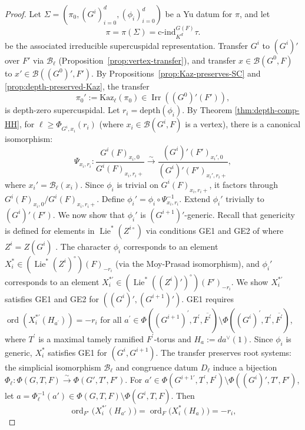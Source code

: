 \documentclass[american]{article}
\numberwithin{equation}{section}
\numberwithin{figure}{section}
\theoremstyle{plain}
\theoremstyle{definition}
\theoremstyle{remark}
\DeclareMathOperator{\Irr}{Irr}
\begin{document}
\begin{proof}
Let $\Sigma = (\pi_0, (G^i)_{i=0}^d, (\phi_i)_{i=0}^d)$ be a Yu datum for $\pi$, and let 
\[
\pi = \pi(\Sigma) = \mathrm{c\text{-}ind}_{K^d}^{G(F)} \tau.
\]
be the associated irreducible supercuspidal representation.
Transfer $G^i$ to $(G^i)'$ over $F'$ via $\mathscr{B}_\ell$ (Proposition~\ref{prop:vertex-transfer}), and transfer $x \in \mathcal{B}(G^0, F)$ to $x' \in \mathcal{B}((G^0)', F')$.
By Propositions~\ref{prop:Kaz-preserves-SC} and \ref{prop:depth-preserved-Kaz}, the transfer 
\[
\pi_0' := \mathrm{Kaz}_\ell(\pi_0) \in \Irr((G^0)'(F')),
\]
is depth-zero supercuspidal. Let \(r_i = \text{depth}(\phi_i)\). By Theorem \ref{thm:depth-comp-HH}, for \(\ell \geq \Phi_{G^i,x_i}(r_i)\) (where \(x_i \in \mathcal{B}(G^i, F)\) is a vertex), there is a canonical isomorphism:
     \[
     \Psi_{x_i, r_i}: \frac{G^i(F)_{x_i,0}}{G^i(F)_{x_i, r_i+}} \stackrel{\sim}{\longrightarrow} \frac{(G^i)'(F')_{x_i',0}}{(G^i)'(F')_{x_i', r_i+}},
     \]
where \(x_i' = \mathscr{B}_\ell(x_i)\). Since \(\phi_i\) is trivial on \(G^i(F)_{x_i, r_i+}\), it factors through \(G^i(F)_{x_i,0}/G^i(F)_{x_i, r_i+}\). Define \(\phi_i'=\phi_i\circ\Psi_{x_i, r_i}^{-1}\). Extend \(\phi_i'\) trivially to \((G^i)'(F')\). We now show that \(\phi_i'\) is \((G^{i+1})'\)-generic.  Recall that genericity is defined for elements in \(\operatorname{Lie}^*(Z^{i\circ})\)  via conditions GE1 and GE2 of \cite[\S 8]{Yu2001} where \(Z^i=Z(G^i)\) . The character \(\phi_i\) corresponds to an element \(X^*_i \in (\operatorname{Lie}^*(Z^i)^\circ)(F)_{-r_i}\) (via the Moy-Prasad isomorphism), and \(\phi_i'\) corresponds to an element \(X^{*\prime}_i \in (\operatorname{Lie}^*((Z^i)')^\circ)(F')_{-r_i}\). We show \(X^{*\prime}_i\) satisfies GE1 and GE2 for \(((G^i)', (G^{i+1})')\).  GE1 requires \(\operatorname{ord}(X_i^{*\prime}(H_{a^\prime})) = -r_i\) for all \(a^\prime \in \Phi((G^{i+1})^\prime, T^\prime, \overline{F^\prime}) \setminus \Phi((G^{i})^\prime, T^\prime, \overline{F^\prime})\), where \(T^\prime\) is a maximal tamely ramified \(F^\prime\)-torus and \(H_a:=da^\vee(1)\). Since \(\phi_i\) is generic, \(X^*_i\) satisfies GE1 for \((G^i, G^{i+1})\). The transfer preserves root systems: the simplicial isomorphism \(\mathscr{B}_\ell\) and congruence datum \(D_\ell\) induce a bijection \(\Phi_\ell : \Phi(G, T, F) \xrightarrow{\sim} \Phi(G', T', F')\). For \(a' \in \Phi(G^{{i+1}\prime}, T^{\prime}, F^\prime) \setminus \Phi((G^i)', T', F')\), let \(a = \Phi_\ell^{-1}(a') \in \Phi(G, T, F) \setminus \Phi(G^i, T, F)\). Then
  \[
  \operatorname{ord}_{F'}\big( X^{*\prime}_i(H_{a'}) \big) = \operatorname{ord}_F \big( X^*_i(H_a) \big) = -r_i,
\]
\end{proof}
\end{document}
